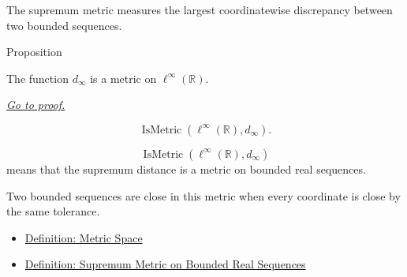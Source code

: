 \begin{remark*}[Interpretation]
The supremum metric measures the largest coordinatewise discrepancy between
two bounded sequences.
\end{remark*}

\DefinitionalRoot

\begin{propositionbox}{Proposition}
\begin{proposition}
\label{prop:bounded-real-sequence-space-sup-metric}
The function \(d_\infty\) is a metric on \(\ell^\infty(\mathbb{R})\).

\smallskip
\noindent
\hyperref[prf:bounded-real-sequence-space-sup-metric]{\textit{Go to proof.}}
\end{proposition}
\end{propositionbox}

\begin{remark*}
\[
  \operatorname{IsMetric}(\ell^\infty(\mathbb{R}),d_\infty).
\]
\end{remark*}

\begin{remark*}
\[
\operatorname{IsMetric}(\ell^\infty(\mathbb{R}),d_\infty)
\]
means that the supremum distance is a metric on bounded real sequences.
\end{remark*}

\begin{remark*}[Interpretation]
Two bounded sequences are close in this metric when every coordinate is close
by the same tolerance.
\end{remark*}

\begin{dependencies}
\begin{itemize}
  \item \hyperref[def:metric-space]{Definition: Metric Space}
  \item \hyperref[def:bounded-real-sequence-space]{Definition: Supremum Metric on Bounded Real Sequences}
\end{itemize}
\end{dependencies}
